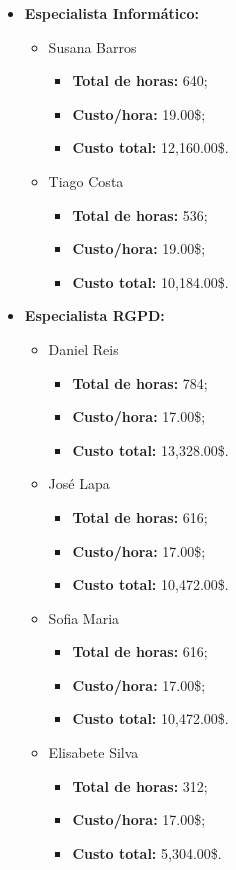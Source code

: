 \begin{itemize}
	\item \textbf{Especialista Informático:}
		\begin{itemize}
			\item Susana Barros
				\begin{itemize}
					\item \textbf{Total de horas:} 640;
					\item \textbf{Custo/hora:} 19.00\$;
					\item \textbf{Custo total:} 12,160.00\$.
				\end{itemize}
			\item Tiago Costa
				\begin{itemize}
					\item \textbf{Total de horas:} 536;
					\item \textbf{Custo/hora:} 19.00\$;
					\item \textbf{Custo total:} 10,184.00\$.
				\end{itemize}
		\end{itemize}

	\item \textbf{Especialista RGPD:}
		\begin{itemize}
			\item Daniel Reis
				\begin{itemize}
					\item \textbf{Total de horas:} 784;
					\item \textbf{Custo/hora:} 17.00\$;
					\item \textbf{Custo total:} 13,328.00\$.
				\end{itemize}
			\item José Lapa
				\begin{itemize}
					\item \textbf{Total de horas:} 616;
					\item \textbf{Custo/hora:} 17.00\$;
					\item \textbf{Custo total:} 10,472.00\$.
				\end{itemize}
			\item Sofia Maria
				\begin{itemize}
					\item \textbf{Total de horas:} 616;
					\item \textbf{Custo/hora:} 17.00\$;
					\item \textbf{Custo total:} 10,472.00\$.
				\end{itemize}
			\item Elisabete Silva
				\begin{itemize}
					\item \textbf{Total de horas:} 312;
					\item \textbf{Custo/hora:} 17.00\$;
					\item \textbf{Custo total:} 5,304.00\$.
				\end{itemize}
		\end{itemize}


\end{itemize}
